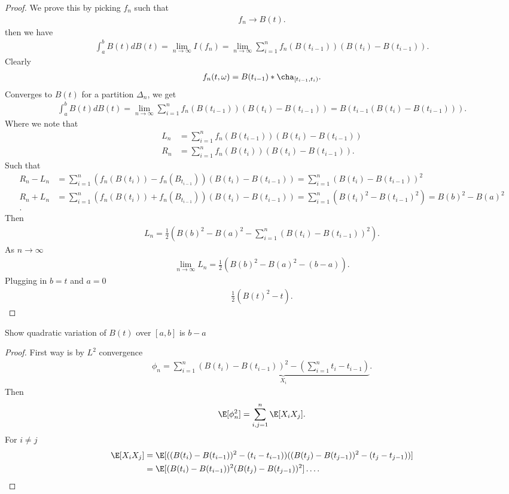 \begin{proof}
 We prove this by picking $f_n$ such that 
 \begin{align*}
  f_n \to  B(t)
 .\end{align*}
 then we have 
 \begin{align*}
   \int_{a}^{b}  B(t) dB(t) = \lim_{n \to \infty} I(f_n) = \lim_{n \to \infty} \sum_{i=1}^{n}  f_n(B(t_{i-1}))(B(t_i)-B(t_{i-1}))
 .\end{align*}
 Clearly 
 \begin{align*}
   f_n(t,\omega ) = B(t_{i-1})*\cha_{[t_{i-1},t_i)}
 .\end{align*}
 Converges to $B(t)$ for a partition $\Delta_n$, we get
 \begin{align*}
   \int_{a}^{b}  B(t) dB(t) = \lim_{n\to \infty} \sum_{i=1}^{n} f_n(B(t_{i-1}))(B(t_i)-B(t_{i-1})) = B(t_{i-1}(B(t_i)-B(t_{i-1})))
 .\end{align*}
 Where we note that 
 \begin{align*}
   L_n &= \sum_{i=1}^{n} f_n(B(t_{i-1}))(B(t_i)-B(t_{i-1}))\\
  R_n &= \sum_{i=1}^{n} f_n(B(t_{i}))(B(t_i)-B(t_{i-1}))
 .\end{align*}
 Such that 
 \begin{align*}
   R_n - L_n &=  \sum_{i=1}^{n} (f_n(B(t_{i}))-f_n(B_{t_{i-1}}))(B(t_i)-B(t_{i-1})) = \sum_{i=1}^{n} (B(t_i)-B(t_{i-1}))^2 \\
   R_n + L_n &=  \sum_{i=1}^{n} (f_n(B(t_{i}))+f_n(B_{t_{i-1}}))(B(t_i)-B(t_{i-1})) = \sum_{i=1}^{n} (B(t_i)^2-B(t_{i-1})^2) = B(b)^2 - B(a)^2\\
 .\end{align*}
 Then 
 \begin{align*}
   L_n =  \frac{1}{2} (B(b)^2-B(a)^2 -\sum_{i=1}^{n} (B(t_i)-B(t_{i-1}))^2 )
 .\end{align*}
 As $n\to \infty$
 \begin{align*}
   \lim_{n\to \infty} L_n  = \frac{1}{2}(B(b)^2-B(a)^2 -  (b-a))
 .\end{align*}
 Plugging in $b=t$ and $a=0$
 \begin{align*}
  \frac{1}{2}(B(t)^2-t)
 .\end{align*}
\end{proof}
\begin{exercise}
  Show quadratic variation of $B(t)$  over $[a,b]$ is $b-a$
\end{exercise}
\begin{proof}
  First way is by $L^2$ convergence 
 \begin{align*}
   \phi_n = \sum_{i=1}^{n} \underbrace{(B(t_i)-B(t_{i-1}))^2 - (\sum_{i=1}^{n}  t_i-t_{i-1})}_{X_i}
 .\end{align*} 
 Then 
 \begin{align*}
   \E[\phi_n^2] = \sum_{i,j=1}^{n} \E[X_iX_j]
 .\end{align*}
 For $i\neq j$ 
 \begin{align*}
   \E[X_iX_j] &=  \E[((B(t_i)-B(t_{i-1}))^2 - (t_i-t_{i-1}))((B(t_j)-B(t_{j-1}))^2 - (t_j-t_{j-1}))]\\
              &= \E[(B(t_i)-B(t_{i-1}))^2(B(t_j)-B(t_{j-1}))^2] \ldots  
 .\end{align*}
\end{proof}
